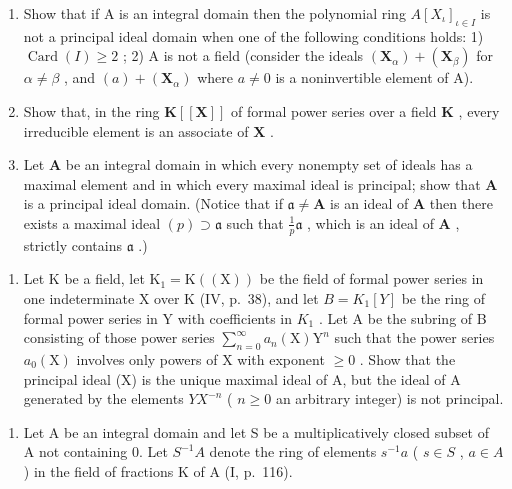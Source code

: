 \BourbakiExerciseGroup

\begin{enumerate}
\def\labelenumi{\arabic{enumi})}
\item
  Show that if A is an integral domain then the polynomial ring \(A[X_{\iota}]_{\iota \in I}\) is not a principal ideal domain when one of the following conditions holds: 1) \(\operatorname{Card}(I) \geqslant 2\) ; 2) A is not a field (consider the ideals \((\mathbf{X}_{\alpha}) + (\mathbf{X}_{\beta})\) for \(\alpha \neq \beta\) , and \((a) + (\mathbf{X}_{\alpha})\) where \(a \neq 0\) is a noninvertible element of A).
\item
  Show that, in the ring \(\mathbf{K}[[\mathbf{X}]]\) of formal power series over a field \(\mathbf{K}\) , every irreducible element is an associate of \(\mathbf{X}\) .
\item
  Let \(\mathbf{A}\) be an integral domain in which every nonempty set of ideals has a maximal element and in which every maximal ideal is principal; show that \(\mathbf{A}\) is a principal ideal domain. (Notice that if \(\mathfrak{a} \neq \mathbf{A}\) is an ideal of \(\mathbf{A}\) then there exists a maximal ideal \((p) \supset \mathfrak{a}\) such that \(\frac{1}{p} \mathfrak{a}\) , which is an ideal of \(\mathbf{A}\) , strictly contains \(\mathfrak{a}\) .)
\end{enumerate}

\begin{enumerate}
\def\labelenumi{\alph{enumi})}
\setcounter{enumi}{1}
\tightlist
\item
  Let K be a field, let \(\mathrm{K}_{1}=\mathrm{K}((\mathrm{X}))\) be the field of formal power series in one indeterminate X over K (IV, p.~38), and let \(B=K_{1}[Y]\) be the ring of formal power series in Y with coefficients in \(K_{1}\) . Let A be the subring of B consisting of those power series \(\sum_{n=0}^{\infty}a_{n}(\mathrm{X})\mathrm{Y}^{n}\) such that the power series \(a_{0}(\mathrm{X})\) involves only powers of X with exponent \(\geqslant 0\) . Show that the principal ideal (X) is the unique maximal ideal of A, but the ideal of A generated by the elements \(YX^{-n}\) ( \(n \geqslant 0\) an arbitrary integer) is not principal.
\end{enumerate}

\begin{enumerate}
\def\labelenumi{\arabic{enumi})}
\setcounter{enumi}{3}
\tightlist
\item
  Let A be an integral domain and let S be a multiplicatively closed subset of A not containing 0. Let \(S^{-1}A\) denote the ring of elements \(s^{-1}a\) ( \(s \in S\) , \(a \in A\) ) in the field of fractions K of A (I, p.~116).
\end{enumerate}

